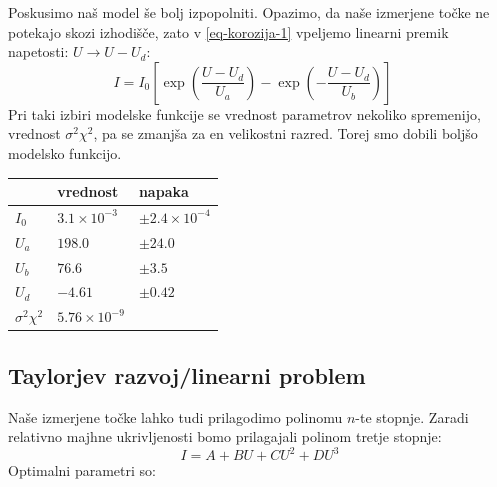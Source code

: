 \documentclass[slovene,11pt,a4paper]{article}
\numberwithin{equation}{section} %
\numberwithin{figure}{section} %
\numberwithin{table}{section} %
\begin{document}
Poskusimo naš model še bolj izpopolniti. Opazimo, da naše izmerjene točke ne potekajo skozi izhodišče, zato v \ref{eq-korozija-1} vpeljemo linearni premik napetosti: $U \rightarrow U-U_d$:
\begin{equation}
\label{eq-korozija-2}
I=I_0\left[\exp\left(\frac{U-U_d}{U_a}\right)-\exp\left(-\frac{U-U_d}{U_b}\right)\right]\quad
\end{equation}
Pri taki izbiri modelske funkcije se vrednost parametrov nekoliko spremenijo, vrednost $\sigma^2 \chi^2$, pa se zmanjša za en velikostni razred. Torej smo dobili boljšo modelsko funkcijo.

\begin{table}[h]
\begin{center}
\begin{tabular}{|l|l|l|}
\hline
 & vrednost & napaka \\ \hline
$I_0$ & $3.1\times 10^{-3}$ & $\pm2.4\times 10^{-4}$ \\ \hline
$U_a$ & $198.0$ & $\pm24.0$ \\ \hline
$U_b$ & $76.6$ & $\pm3.5$ \\ \hline
$U_d$ & $-4.61$ & $\pm0.42$ \\ \hline
$\sigma^2 \chi^2$ & $5.76\times 10^{-9}$ &  \\ \hline
\end{tabular}
\end{center}
\end{table}



\subsection{Taylorjev razvoj/linearni problem}
Naše izmerjene točke lahko tudi prilagodimo polinomu $n$-te stopnje. Zaradi relativno majhne ukrivljenosti bomo prilagajali polinom tretje stopnje:
\begin{equation}
\label{korozija-taylor1}
I=A+B U+C U^2+D U^3
\end{equation}
Optimalni parametri so:
\end{document}
